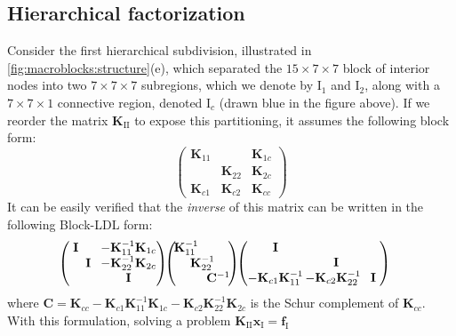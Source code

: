 \subsection{Hierarchical factorization}

Consider the first hierarchical subdivision, illustrated in
\ref{fig:macroblocks:structure}(e), which separated the $15\times 7\times 7$ block
of interior nodes into two $7\times 7\times 7$ subregions, which we
denote by $\textrm{I}_1$ and $\textrm{I}_2$, along with a
$7\times 7\times 1$ connective region, denoted $\textrm{I}_c$ (drawn
blue in the figure above). If we reorder the matrix
$\mathbf{K}_{\textrm{II}}$ to expose this partitioning, it assumes the
following block form:
$$
\left(
\begin{array}{ccc}
\mathbf{K}_{11} & & \mathbf{K}_{1c} \\
& \mathbf{K}_{22} & \mathbf{K}_{2c} \\
\mathbf{K}_{c1} & \mathbf{K}_{c2} & \mathbf{K}_{cc}
\end{array}
\right)
$$
It can be easily verified that the \emph{inverse} of this matrix can
be written in the following Block-LDL form:
$$
\hspace*{-.15in}\left(
\begin{array}{ccc}
\!\!\!\mathbf{I}\!\!\!  & & -\mathbf{K}_{11}^{-1}\mathbf{K}_{1c}\!\!\! \\
& \!\!\!\mathbf{I}\!\!\! & -\mathbf{K}_{22}^{-1}\mathbf{K}_{2c}\!\!\! \\
& & \mathbf{I}\!\!\!
\end{array}
\right)\!\!
\left(
\begin{array}{ccc}
\!\!\!\!\mathbf{K}_{11}^{-1}\!\!\!\!\!  & &  \\
& \!\!\!\!\!\mathbf{K}_{22}^{-1}\!\!\!\!\! & \\
& & \!\!\!\!\!\mathbf{C}^{-1}\!\!\!\!
\end{array}
\right)\!\!
\left(
\begin{array}{ccc}
\!\!\!\mathbf{I}\!\!  & &  \\
& \mathbf{I} & \\
\!\!\!-\mathbf{K}_{c1}\mathbf{K}_{11}^{-1}\!\! & \!\!\!-\mathbf{K}_{c2}\mathbf{K}_{22}^{-1} & \!\!\!\mathbf{I}\!\!\!
\end{array}
\right)
$$
where
$\mathbf{C}=\mathbf{K}_{cc}-\mathbf{K}_{c1}\mathbf{K}_{11}^{-1}\mathbf{K}_{1c}-\mathbf{K}_{c2}\mathbf{K}_{22}^{-1}\mathbf{K}_{2c}$
is the Schur complement of $\mathbf{K}_{cc}$. With this formulation,
solving a problem
$\mathbf{K}_{\textrm{II}}\mathbf{x}_\textrm{I}=\mathbf{f}_\textrm{I}$
